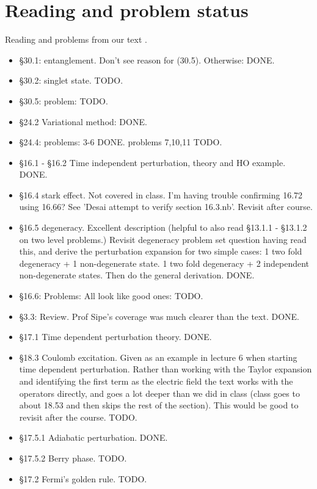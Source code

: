 \chapter{Reading and problem status}

Reading and problems from our text \cite{desai2009quantum}.

\begin{itemize}
\item \S 30.1: entanglement.  Don't see reason for (30.5).  Otherwise: DONE.
\item \S 30.2: singlet state.  TODO.
\item \S 30.5: problem: TODO.
\item \S 24.2 Variational method: DONE.
\item \S 24.4: problems: 3-6 DONE.  problems 7,10,11 TODO.
\item \S 16.1 - \S 16.2 Time independent perturbation, theory and HO example.  DONE.
\item \S 16.4 stark effect.  Not covered in class.  I'm having trouble confirming 16.72 using 16.66?  See 'Desai attempt to verify section 16.3.nb'.  Revisit after course.
\item \S 16.5 degeneracy.  Excellent description (helpful to also read \S 13.1.1 - \S 13.1.2 on two level problems.)  Revisit degeneracy problem set question having read this, and derive the perturbation expansion for two simple cases: 1 two fold degeneracy + 1 non-degenerate state.  1 two fold degeneracy + 2 independent non-degenerate states.  Then do the general derivation.  DONE.
\item \S 16.6: Problems: All look like good ones: TODO.
\item \S 3.3: Review.  Prof Sipe's coverage was much clearer than the text.  DONE.
\item \S 17.1 Time dependent perturbation theory.  DONE.
\item \S 18.3 Coulomb excitation.  Given as an example in lecture 6 when starting time dependent perturbation.  Rather than working with the Taylor expansion and identifying the first term as the electric field the text works with the operators directly, and goes a lot deeper than we did in class (class goes to about 18.53 and then skips the rest of the section).  This would be good to revisit after the course.  TODO.
\item \S 17.5.1 Adiabatic perturbation.  DONE.
\item \S 17.5.2 Berry phase. TODO.
\item \S 17.2 Fermi's golden rule. TODO.

\end{itemize}
